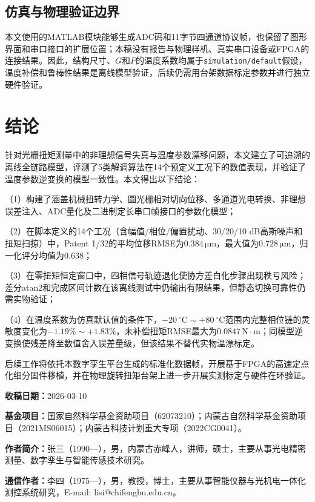 \documentclass[UTF8,a4paper,12pt]{ctexart}
\begin{document}
\subsection{仿真与物理验证边界}
本文使用的MATLAB模块能够生成ADC码和11字节四通道协议帧，也保留了图形界面和串口接口的扩展位置；本稿没有报告与物理样机、真实串口设备或FPGA的连接结果。因此，结构尺寸、$G$和$P$的温度系数均属于\texttt{simulation/default}假设，温度补偿和鲁棒性结果是离线模型验证，后续仍需用台架数据标定参数并进行独立硬件验证。

\section{结论}

针对光栅扭矩测量中的非理想信号失真与温度参数漂移问题，本文建立了可追溯的离线全链路模型，评测了5类解调算法在14个预定义工况下的数值表现，并验证了温度参数逆变换的模型一致性。本文得出以下结论：

（1）构建了涵盖机械扭转力学、圆光栅相对切向位移、多通道光电转换、非理想误差注入、ADC量化及二进制定长串口帧接口的参数化模型；

（2）在脚本定义的14个工况（含幅值/相位/偏置扰动、30/20/10 dB高斯噪声和扭矩扫掠）中，Patent 1/32的平均位移RMSE为$0.384\,\mathrm{\mu m}$，最大值为$0.728\,\mathrm{\mu m}$，归一化评分均值为0.638；

（3）在零扭矩恒定窗口中，四相信号轨迹退化使协方差白化步骤出现秩亏风险；差分atan2和完成区间计数在该离线测试中仍输出有限结果，但静态切换可靠性仍需实物验证；

（4）在温度系数为仿真默认值的条件下，$-20~^\circ\mathrm{C}\sim +80~^\circ\mathrm{C}$范围内完整相位链的灵敏度变化为$-1.19\%\sim +1.83\%$，未补偿扭矩RMSE最大为$0.0847\,\mathrm{N\cdot m}$；同模型逆变换使残差降至数值舍入误差量级，但该结果不替代实物温漂标定。

后续工作将依托本数字孪生平台生成的标准化数据帧，开展基于FPGA的高速定点化细分固件移植，并在物理旋转扭矩台架上进一步开展实测标定与硬件在环验证。

\vspace{1.5em}
\noindent\textbf{收稿日期：}2026-03-10\par
\noindent\textbf{基金项目：}国家自然科学基金资助项目（62073210）；内蒙古自然科学基金资助项目（2021MS06015）；内蒙古科技计划重大专项（2022CG0041）。\par
\noindent\textbf{作者简介：}张三（1990—），男，内蒙古赤峰人，讲师，硕士，主要从事光电精密测量、数字孪生与智能传感技术研究。\par
\noindent\textbf{通信作者：}李四（1975—），男，教授，博士，主要从事智能仪器与光机电一体化测控系统研究，E-mail: lisi@chifenghu.edu.cn。\par



\end{document}
